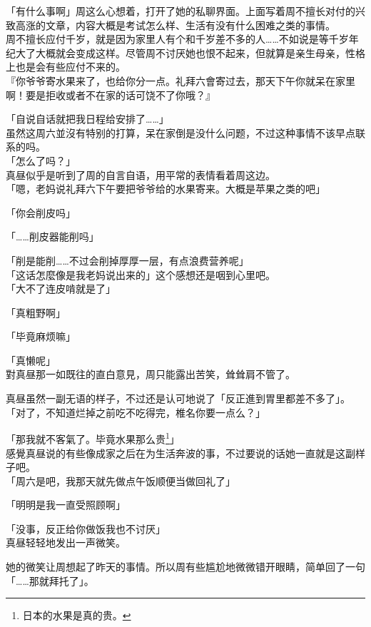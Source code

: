 「有什么事啊」周这么心想着，打开了她的私聊界面。上面写着周不擅长对付的兴致高涨的文章，内容大概是考试怎么样、生活有没有什么困难之类的事情。\\

周不擅长应付千岁，就是因为家里人有个和千岁差不多的人……不如说是等千岁年纪大了大概就会变成这样。尽管周不讨厌她也恨不起来，但就算是亲生母亲，性格上也是会有些应付不来的。\\%

『你爷爷寄水果来了，也给你分一点。礼拜六會寄过去，那天下午你就呆在家里啊！要是拒收或者不在家的话可饶不了你哦？』

「自说自话就把我日程给安排了……」\\

虽然这周六並沒有特别的打算，呆在家倒是没什么问题，不过这种事情不该早点联系的吗。\\

「怎么了吗？」\\

真昼似乎是听到了周的自言自语，用平常的表情看着周这边。\\

「嗯，老妈说礼拜六下午要把爷爷给的水果寄来。大概是苹果之类的吧」

「你会削皮吗」

「……削皮器能削吗」

「削是能削……不过会削掉厚厚一层，有点浪费营养呢」\\

「这话怎麼像是我老妈说出来的」这个感想还是咽到心里吧。\\

「大不了连皮啃就是了」

「真粗野啊」

「毕竟麻烦嘛」

「真懒呢」\\%

對真昼那一如既往的直白意見，周只能露出苦笑，耸耸肩不管了。

真昼虽然一副无语的样子，不过还是认可地说了「反正進到胃里都差不多了」。\\

「对了，不知道烂掉之前吃不吃得完，椎名你要一点么？」

「那我就不客氣了。毕竟水果那么贵\footnote{日本的水果是真的贵。}」\\

感覺真昼说的有些像成家之后在为生活奔波的事，不过要说的话她一直就是这副样子吧。\\%

「周六是吧，我那天就先做点午饭顺便当做回礼了」

「明明是我一直受照顾啊」

「没事，反正给你做饭我也不讨厌」\\

真昼轻轻地发出一声微笑。

她的微笑让周想起了昨天的事情。所以周有些尴尬地微微错开眼睛，简单回了一句「……那就拜托了」。
